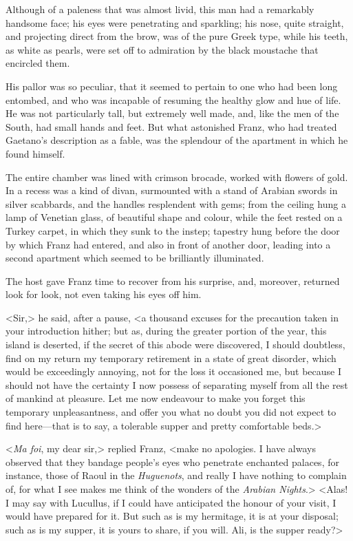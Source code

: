  Although of a paleness that was almost livid, this man had a remarkably handsome face; his eyes were penetrating and sparkling; his nose, quite straight, and projecting direct from the brow, was of the pure Greek type, while his teeth, as white as pearls, were set off to admiration by the black moustache that encircled them. 

 His pallor was so peculiar, that it seemed to pertain to one who had been long entombed, and who was incapable of resuming the healthy glow and hue of life. He was not particularly tall, but extremely well made, and, like the men of the South, had small hands and feet. But what astonished Franz, who had treated Gaetano's description as a fable, was the splendour of the apartment in which he found himself. 

 The entire chamber was lined with crimson brocade, worked with flowers of gold. In a recess was a kind of divan, surmounted with a stand of Arabian swords in silver scabbards, and the handles resplendent with gems; from the ceiling hung a lamp of Venetian glass, of beautiful shape and colour, while the feet rested on a Turkey carpet, in which they sunk to the instep; tapestry hung before the door by which Franz had entered, and also in front of another door, leading into a second apartment which seemed to be brilliantly illuminated. 

 The host gave Franz time to recover from his surprise, and, moreover, returned look for look, not even taking his eyes off him. 

 <Sir,> he said, after a pause, <a thousand excuses for the precaution taken in your introduction hither; but as, during the greater portion of the year, this island is deserted, if the secret of this abode were discovered, I should doubtless, find on my return my temporary retirement in a state of great disorder, which would be exceedingly annoying, not for the loss it occasioned me, but because I should not have the certainty I now possess of separating myself from all the rest of mankind at pleasure. Let me now endeavour to make you forget this temporary unpleasantness, and offer you what no doubt you did not expect to find here—that is to say, a tolerable supper and pretty comfortable beds.> 

 <\textit{Ma foi}, my dear sir,> replied Franz, <make no apologies. I have always observed that they bandage people's eyes who penetrate enchanted palaces, for instance, those of Raoul in the \textit{Huguenots}, and really I have nothing to complain of, for what I see makes me think of the wonders of the \textit{Arabian Nights}.>  <Alas! I may say with Lucullus, if I could have anticipated the honour of your visit, I would have prepared for it. But such as is my hermitage, it is at your disposal; such as is my supper, it is yours to share, if you will. Ali, is the supper ready?> 

